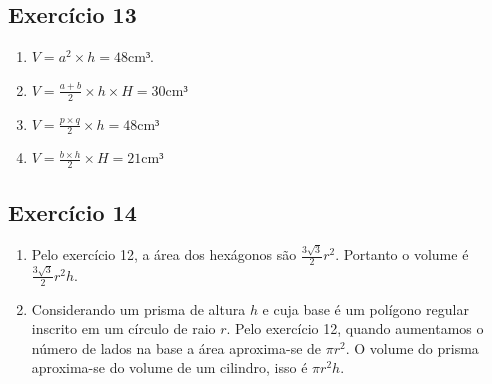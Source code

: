 \subsection*{Exercício 13}

\begin{enumerate}
\item $V = a^2 \times h = 48 \text{cm³}$.
\item $V = \frac{a+b}{2} \times h \times H = 30 \text{cm³}$
\item $V = \frac{p \times q}{2} \times h = 48 \text{cm³}$
\item $V=\frac{b \times h}{2} \times H = 21 \text{cm³}$
\end{enumerate}

\subsection*{Exercício 14}

\begin{enumerate}
\item Pelo exercício 12, a área dos hexágonos são $\frac{3 \sqrt{3}}{2} r^2$.
  Portanto o volume é $\frac{3 \sqrt{3}}{2} r^2 h$.
\item Considerando um prisma de altura $h$ e cuja base é um polígono regular
  inscrito em um círculo de raio $r$. Pelo exercício 12, quando aumentamos o
  número de lados na base a área aproxima-se de $\pi r^2$. O volume do prisma
  aproxima-se do volume de um cilindro, isso é $\pi r^2 h$.
\end{enumerate}
